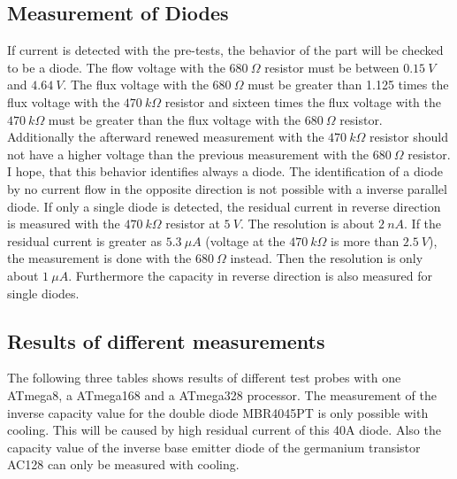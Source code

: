 \subsection{Measurement of Diodes}
\label{sec:diode}
If current is detected with the pre-tests, the behavior of the part will be checked to be a diode.
The flow voltage with the \(680~\Omega\) resistor must be between \(0.15~V\) and \(4.64~V\).
The flux voltage with the \(680~\Omega\) must be greater than 1.125 times the flux voltage with
the \(470~k\Omega\) resistor and sixteen times the flux voltage with the \(470~k\Omega\) must be
greater than the flux voltage with the \(680~\Omega\) resistor.
Additionally the afterward renewed measurement with the \(470~k\Omega\) resistor should not have a higher voltage than
the previous measurement with the \(680~\Omega\) resistor.
I hope, that this behavior identifies always a diode.
The identification of a diode by no current flow in the opposite direction is not
possible with a inverse parallel diode.
If only a single diode is detected, the residual current in reverse direction is measured with
the \(470~k\Omega\) resistor at \(5~V\). The resolution is about \(2~nA\).
If the residual current is greater as \(5.3~\mu A\) (voltage at
the \(470~k\Omega\) is more than \(2.5~V\)), the measurement is done with the \(680~\Omega\) instead.
Then the resolution is only about \(1~\mu A\).
Furthermore  the capacity in reverse direction is also measured for single diodes.

\subsection{Results of different measurements}
The following three tables shows results of different test probes 
with one ATmega8, a ATmega168 and a ATmega328 processor.
The measurement of the inverse capacity value for the double diode MBR4045PT is 
only possible with cooling. This will be caused by high residual current of this 40A diode.
Also the capacity value of the inverse base emitter diode of the germanium transistor AC128 can
only be measured with cooling.

